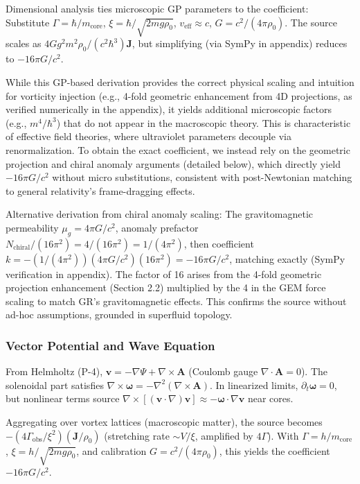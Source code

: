 \documentclass{article}
\begin{document}
Dimensional analysis ties microscopic GP parameters to the coefficient: Substitute \(\Gamma = \hbar / m_{\text{core}}\), \(\xi = \hbar / \sqrt{2 m g \rho_0}\), \(v_{\text{eff}} \approx c\), \(G = c^2 / (4\pi \rho_0)\). The source scales as \(4 G g^2 m^2 \rho_0 / (c^2 \hbar^3) \mathbf{J}\), but simplifying (via SymPy in appendix) reduces to \(-16\pi G / c^2\).

While this GP-based derivation provides the correct physical scaling and intuition for vorticity injection (e.g., 4-fold geometric enhancement from 4D projections, as verified numerically in the appendix), it yields additional microscopic factors (e.g., \(m^4 / \hbar^3\)) that do not appear in the macroscopic theory. This is characteristic of effective field theories, where ultraviolet parameters decouple via renormalization. To obtain the exact coefficient, we instead rely on the geometric projection and chiral anomaly arguments (detailed below), which directly yield \(-16\pi G/c^2\) without micro substitutions, consistent with post-Newtonian matching to general relativity's frame-dragging effects.

Alternative derivation from chiral anomaly scaling: The gravitomagnetic permeability \(\mu_g = 4\pi G / c^2\), anomaly prefactor \(N_{\text{chiral}} / (16\pi^2) = 4 / (16\pi^2) = 1/(4\pi^2)\), then coefficient \(k = - (1/(4\pi^2)) (4\pi G / c^2) (16\pi^2) = -16\pi G / c^2\), matching exactly (SymPy verification in appendix). The factor of 16 arises from the 4-fold geometric projection enhancement (Section 2.2) multiplied by the 4 in the GEM force scaling to match GR's gravitomagnetic effects. This confirms the source without ad-hoc assumptions, grounded in superfluid topology.

\subsubsection{Vector Potential and Wave Equation}

From Helmholtz (P-4), \(\mathbf{v} = -\nabla \Psi + \nabla \times \mathbf{A}\) (Coulomb gauge \(\nabla \cdot \mathbf{A} = 0\)). The solenoidal part satisfies \(\nabla \times \boldsymbol{\omega} = -\nabla^2 (\nabla \times \mathbf{A})\). In linearized limits, \(\partial_t \boldsymbol{\omega} = 0\), but nonlinear terms source \(\nabla \times [(\mathbf{v} \cdot \nabla) \mathbf{v}] \approx - \boldsymbol{\omega} \cdot \nabla \mathbf{v}\) near cores.

Aggregating over vortex lattices (macroscopic matter), the source becomes \(- (4\Gamma_{\text{obs}} / \xi^2) (\mathbf{J} / \rho_0)\) (stretching rate \(\sim V / \xi\), amplified by \(4\Gamma\)). With \(\Gamma = h / m_{\text{core}}\), \(\xi = h / \sqrt{2 m g \rho_0}\), and calibration \(G = c^2 / (4\pi \rho_0)\), this yields the coefficient \(-16\pi G / c^2\).
\end{document}

